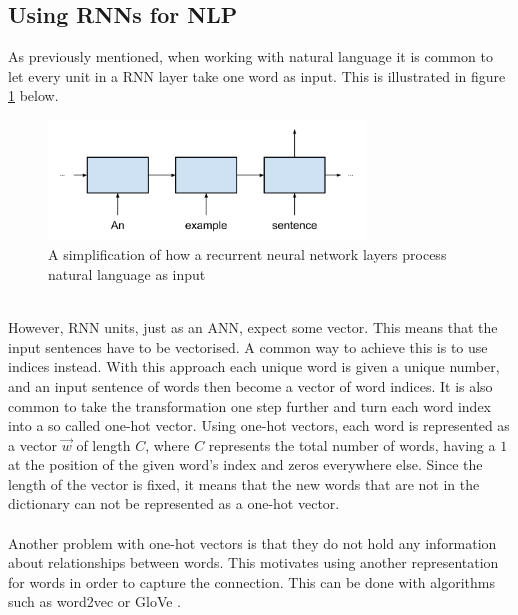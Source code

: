 \subsection{Using RNNs for NLP}\label{sec:rnn_nlp}
As previously mentioned, when working with natural language it is common to let every unit in a RNN layer take one word as input. This is illustrated in figure \ref{fig:sentence_to_rnn} below.
\begin{figure}[h]
    \centering
    \includegraphics[width=0.75\textwidth]{figure/ann/sentence_to_rnn}
    \caption{A simplification of how a recurrent neural network layers process natural language as input}
    \label{fig:sentence_to_rnn}
\end{figure}
\\
However, RNN units, just as an ANN, expect some vector. This means that the input sentences have to be vectorised. A common way to achieve this is to use indices instead. With this approach each unique word is given a unique number, and an input sentence of words then become a vector of word indices. It is also common to take the transformation one step further and turn each word index into a so called one-hot vector\parencite{turian2010word}. Using one-hot vectors, each word is represented as a vector $\vec{w}$ of length $C$, where $C$ represents the total number of words, having a $1$ at the position of the given word's index and zeros everywhere else. Since the length of the vector is fixed, it means that the new words that are not in the dictionary can not be represented as a one-hot vector. 
\\\\
Another problem with one-hot vectors is that they do not hold any information about relationships between words. This motivates using another representation for words in order to capture the connection. This can be done with algorithms such as word2vec \parencite{mikolov2013linguistic} or GloVe \parencite{pennington2014glove}. 